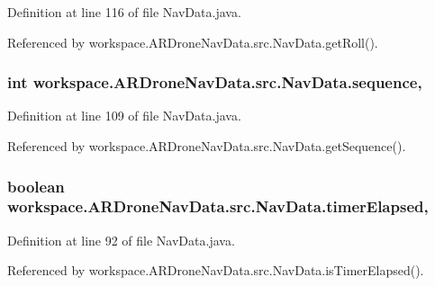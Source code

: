 Definition at line 116 of file Nav\+Data.\+java.



Referenced by workspace.\+A\+R\+Drone\+Nav\+Data.\+src.\+Nav\+Data.\+get\+Roll().

\hypertarget{classworkspace_1_1_a_r_drone_nav_data_1_1src_1_1_nav_data_aa257d1d766978c405e0d98aacb437817}{}
\subsubsection[{sequence}]{\setlength{\rightskip}{0pt plus 5cm}int workspace.\+A\+R\+Drone\+Nav\+Data.\+src.\+Nav\+Data.\+sequence\hspace{0.3cm}{\ttfamily [static]}, {\ttfamily [protected]}}\label{classworkspace_1_1_a_r_drone_nav_data_1_1src_1_1_nav_data_aa257d1d766978c405e0d98aacb437817}


Definition at line 109 of file Nav\+Data.\+java.



Referenced by workspace.\+A\+R\+Drone\+Nav\+Data.\+src.\+Nav\+Data.\+get\+Sequence().

\hypertarget{classworkspace_1_1_a_r_drone_nav_data_1_1src_1_1_nav_data_ac38e4bd16d0841ddefba6500df0e1467}{}
\subsubsection[{timer\+Elapsed}]{\setlength{\rightskip}{0pt plus 5cm}boolean workspace.\+A\+R\+Drone\+Nav\+Data.\+src.\+Nav\+Data.\+timer\+Elapsed\hspace{0.3cm}{\ttfamily [static]}, {\ttfamily [protected]}}\label{classworkspace_1_1_a_r_drone_nav_data_1_1src_1_1_nav_data_ac38e4bd16d0841ddefba6500df0e1467}


Definition at line 92 of file Nav\+Data.\+java.



Referenced by workspace.\+A\+R\+Drone\+Nav\+Data.\+src.\+Nav\+Data.\+is\+Timer\+Elapsed().

